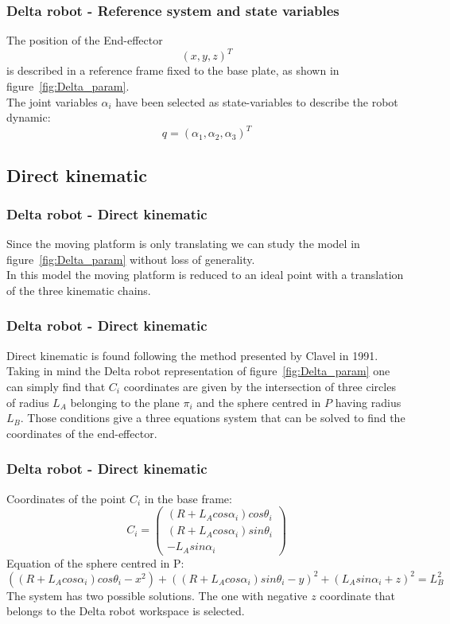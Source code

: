 %
\begin{frame}
\frametitle{Delta robot - Reference system and state variables}
The position of the End-effector
\[
(x,y,z)^T
\]
is described in a reference frame fixed to the base plate, as shown in figure~\ref{fig:Delta_param}.\\
\vspace{.5cm}
The joint variables $\alpha_i$ have been selected as state-variables to describe the robot dynamic:
\[
q = (\alpha_1, \alpha_2, \alpha_3)^T
\]

\end{frame}
%
\subsection{Direct kinematic}
%
\begin{frame}
\frametitle{Delta robot - Direct kinematic}
Since the moving platform is only translating we can study the model in figure~\ref{fig:Delta_param} without loss of generality.\\
In this model the moving platform is reduced to an ideal point with a translation of the three kinematic chains.
\end{frame}
%
\begin{frame}
\frametitle{Delta robot - Direct kinematic}
Direct kinematic is found following the method presented by Clavel in 1991.\\
Taking in mind the Delta robot representation of figure~\ref{fig:Delta_param} one can simply find that $C_i$ coordinates are given by the intersection of three circles of radius $L_A$ belonging to the plane $\pi_i$ and the sphere centred in $P$ having radius $L_B$. Those conditions give a three equations system that can be solved to find the coordinates of the end-effector.
\end{frame}
%
\begin{frame}
\frametitle{Delta robot - Direct kinematic}
%
Coordinates of the point $C_i$ in the base frame:
\begin{equation}
C_i =%
\begin{pmatrix}
	(R + L_Acos\alpha_i)cos\theta_i\\
	(R + L_Acos\alpha_i)sin\theta_i\\
	-L_Asin\alpha_i
\end{pmatrix}
\end{equation}
%
Equation of the sphere centred in P:
%
\small
\begin{equation}
	\left(\left(R + L_Acos\alpha_i\right)cos\theta_i - x^2\right) + \left(\left(R + L_Acos\alpha_i\right)sin\theta_i - y\right)^2 + \left(L_Asin\alpha_i + z\right)^2 = L_B^2
\end{equation}
\normalsize
The system has two possible solutions. The one with negative $z$ coordinate that belongs to the Delta robot workspace is selected.
\end{frame}
